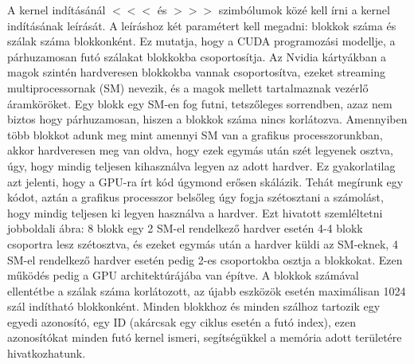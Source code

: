 \documentclass[11pt,a4paper]{article}
\numberwithin{equation}{subsection}
\numberwithin{figure}{section}
\begin{document}
A kernel indításánál \(<\!\!<\!\!<\) és \(>\!\!>\!\!>\) szimbólumok közé kell írni a kernel indításának leírását. A leíráshoz két paramétert kell megadni: blokkok száma és szálak száma blokkonként. Ez mutatja, hogy a CUDA programozási modellje, a párhuzamosan futó szálakat blokkokba csoportosítja. Az Nvidia kártyákban a magok szintén hardveresen blokkokba vannak csoportosítva, ezeket streaming multiprocessornak (SM) nevezik, és a magok mellett tartalmaznak vezérlő áramköröket. Egy blokk egy SM-en fog futni, tetszőleges sorrendben, azaz nem biztos hogy párhuzamosan, hiszen a blokkok száma nincs korlátozva. Amennyiben több blokkot adunk meg mint amennyi SM van a grafikus processzorunkban, akkor hardveresen meg van oldva, hogy ezek egymás után szét legyenek osztva, úgy, hogy mindig teljesen kihasználva legyen az adott hardver. Ez gyakorlatilag azt jelenti, hogy a GPU-ra írt kód úgymond erősen skálázik. Tehát megírunk egy kódot, aztán a grafikus processzor belsőleg úgy fogja szétosztani a számolást, hogy mindig teljesen ki legyen használva a hardver. Ezt hivatott szemléltetni ~ jobboldali ábra: 8 blokk egy 2 SM-el rendelkező hardver esetén 4-4 blokk csoportra lesz szétosztva, és ezeket egymás után a hardver küldi az SM-eknek, 4 SM-el rendelkező hardver esetén pedig 2-es csoportokba osztja a blokkokat. Ezen működés pedig a GPU architektúrájába van építve. A blokkok számával ellentétbe a szálak száma korlátozott, az újabb eszközök esetén maximálisan 1024 szál indítható blokkonként. Minden blokkhoz és minden szálhoz tartozik egy egyedi azonosító, egy ID (akárcsak egy ciklus esetén a futó index), ezen azonosítókat minden futó kernel ismeri, segítségükkel a memória adott területére hivatkozhatunk.
\end{document}
